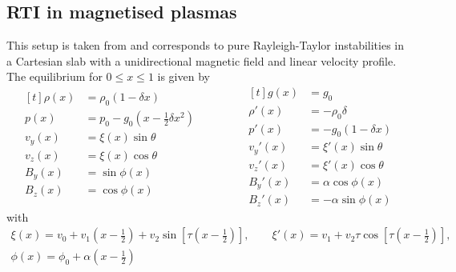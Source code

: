 \documentclass[12pt]{article}
\begin{document}
\newpage
\subsection{RTI in magnetised plasmas}
This setup is taken from \citet{book_MHD} and corresponds to pure Rayleigh-Taylor instabilities in a Cartesian slab with a unidirectional magnetic field and linear velocity profile. The equilibrium for $0 \leq x \leq 1$ is given by
\begin{equation} \label{eq: RTI}
	\begin{aligned}[t]
		\rho(x) &= \rho_0(1 - \delta x) \\
		p(x) &= p_0 - g_0\left(x - \frac{1}{2}\delta x^2\right) \\
		v_y(x) &= \xi(x)\sin\theta \\
		v_z(x) &= \xi(x)\cos\theta \\
		B_y(x) &= \sin\phi(x) \\
		B_z(x) &= \cos\phi(x) \\
	\end{aligned}
	\qquad\qquad
	\begin{aligned}[t]
		g(x) &= g_0 \\
		\rho'(x) &= -\rho_0 \delta \\
		p'(x) &= -g_0(1 - \delta x) \\
		v_y'(x) &= \xi'(x)\sin\theta \\
		v_z'(x) &= \xi'(x)\cos\theta \\
		B_y'(x) &= \alpha\cos\phi(x) \\
		B_z'(x) &= -\alpha\sin\phi(x)
	\end{aligned}
\end{equation}
with
\begin{equation*}
	\begin{gathered}
		\xi(x) = v_0 + v_1\left(x - \frac{1}{2}\right) + v_2\sin\left[\tau\left(x - \frac{1}{2}\right)\right], \qquad
		\xi'(x) = v_1 + v_2\tau \cos\left[\tau\left(x - \frac{1}{2}\right)\right], \\
		\phi(x) = \phi_0 + \alpha\left(x - \frac{1}{2}\right)
	\end{gathered}
\end{equation*}
\end{document}
